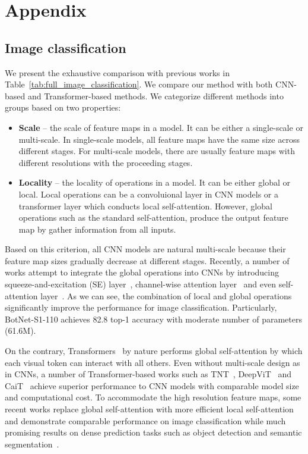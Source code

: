 \documentclass{article}
\begin{document}
\section{Appendix}

\subsection{Image classification}

We present the exhaustive comparison with previous works in Table~\ref{tab:full_image_classification}. We compare our method with both CNN-based and Transformer-based methods. We categorize different methods into groups based on two properties:
\begin{itemize}[noitemsep,topsep=0pt,leftmargin=*]
    \item \textbf{Scale} -- the scale of feature maps in a model. It can be either a single-scale or multi-scale. In single-scale models, all feature maps have the same size across different stages. For multi-scale models, there are usually feature maps with different resolutions with the proceeding stages.
    \item \textbf{Locality} -- the locality of operations in a model. It can be either global or local. Local operations can be a convoluional layer in CNN models or a transformer layer which conducts local self-attention. However, global operations such as the standard self-attention, produce the output feature map by gather information from all inputs.
\end{itemize}

Based on this criterion, all CNN models are natural multi-scale because their feature map sizes gradually decrease at different stages. Recently, a number of works attempt to integrate the global operations into CNNs by introducing squeeze-and-excitation (SE) layer~\cite{hu2018squeeze}, channel-wise attention layer~\cite{woo2018cbam} and even self-attention layer~\cite{bello2019attention,srinivas2021bottleneck}. As we can see, the combination of local and global operations significantly improve the performance for image classification. Particularly, BotNet-S1-110 achieves 82.8 top-1 accuracy with moderate number of parameters (61.6M). 

On the contrary, Transformers~\cite{vaswani2017attention} by nature performs global self-attention by which each visual token can interact with all others. Even without multi-scale design as in CNNs, a number of Transformer-based works such as TNT~\cite{han2021transformer}, DeepViT~\cite{zhou2021deepvit} and CaiT~\cite{touvron2021going} achieve superior performance to CNN models with comparable model size and computational cost. To accommodate the high resolution feature maps, some recent works replace global self-attention with more efficient local self-attention and demonstrate comparable performance on image classification while much promising results on dense prediction tasks such as object detection and semantic segmentation~\cite{liu2021swin}.
\end{document}
